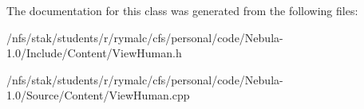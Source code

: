 The documentation for this class was generated from the following files:\begin{DoxyCompactItemize}
\item 
/nfs/stak/students/r/rymalc/cfs/personal/code/Nebula-\/1.0/Include/Content/ViewHuman.h\item 
/nfs/stak/students/r/rymalc/cfs/personal/code/Nebula-\/1.0/Source/Content/ViewHuman.cpp\end{DoxyCompactItemize}
